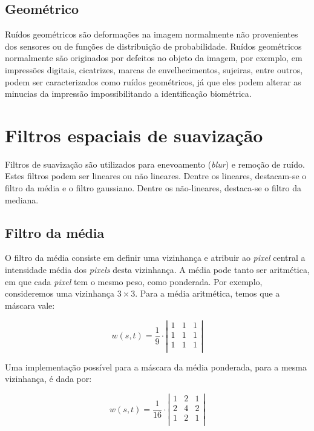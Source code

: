 \documentclass[10pt,a4paper]{article}
\newcommand{\pixel}{\textit{pixel} }
\newcommand{\pixels}{\textit{pixels} }
\begin{document}
\subsection{Geométrico}
Ruídos geométricos são deformações na imagem normalmente não provenientes dos sensores ou de funções de distribuição de probabilidade. Ruídos geométricos normalmente são originados por defeitos no objeto da imagem, por exemplo, em impressões digitais, cicatrizes, marcas de envelhecimentos, sujeiras, entre outros, podem ser caracterizados como ruídos geométricos, já que eles podem alterar as minucias da impressão impossibilitando a identificação biométrica.

\section{Filtros espaciais de suavização}
Filtros de suavização são utilizados para enevoamento (\textit{blur}) e remoção de ruído. Estes filtros podem ser lineares ou não lineares. Dentre os lineares, destacam-se o filtro da média e o filtro gaussiano. Dentre os não-lineares, destaca-se o filtro da mediana.

\subsection{Filtro da média}
O filtro da média consiste em definir uma vizinhança e atribuir ao \pixel central a intensidade média dos \pixels desta vizinhança. A média pode tanto ser aritmética, em que cada \pixel tem o mesmo peso, como ponderada. Por exemplo, consideremos uma vizinhança $3\times3$. Para a média aritmética, temos que a máscara vale:

\[ w(s,t) = \frac{1}{9} \cdot \left|
    \begin{array}{ccc}
        1 & 1 & 1 \\
        1 & 1 & 1 \\
        1 & 1 & 1 \\
\end{array}\right|\]

Uma implementação possível para a máscara da média ponderada, para a mesma vizinhança, é dada por:

\[ w(s,t) = \frac{1}{16} \cdot \left|
    \begin{array}{ccc}
        1 & 2 & 1 \\
        2 & 4 & 2 \\
        1 & 2 & 1 \\
\end{array}\right|\]
\end{document}
